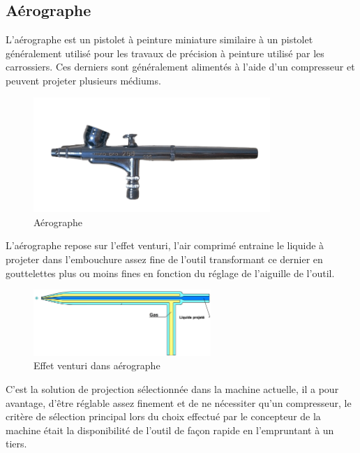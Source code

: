 \newpage
\subsection{Aérographe} \label{section_aerographe}
L'aérographe est un pistolet à peinture miniature similaire à un pistolet généralement utilisé pour les travaux de précision
à peinture utilisé par les carrossiers.
Ces derniers sont généralement alimentés à l'aide d'un compresseur et peuvent projeter plusieurs médiums.

\begin{figure}[H]
    \centering
    \includegraphics[width=0.8\textwidth]{assets/figures/etat_art/airbrush.png}
    \caption[Aérographe]{Aérographe \cite{airbrush_pics}\footnotemark}
\end{figure}

L'aérographe repose sur l'effet venturi, l'air comprimé entraine le liquide à projeter dans l'embouchure assez fine de l'outil
transformant ce dernier en gouttelettes plus ou moins fines en fonction du réglage de l'aiguille de l'outil.

\begin{figure}[H]
    \centering
    \includegraphics[width=0.6\textwidth]{assets/figures/etat_art/effet_venturi_aerographe.jpg}
    \caption[Effet venturi dans un aérographe]{Effet venturi dans aérographe \cite{venturi_airbrush}\footnotemark}
\end{figure}

C'est la solution de projection sélectionnée dans la machine actuelle, il a pour avantage, d'être réglable assez finement
et de ne nécessiter qu'un compresseur, le critère de sélection principal lors du choix effectué par le concepteur de la machine
était la disponibilité de l'outil de façon rapide en l'empruntant à un tiers.


